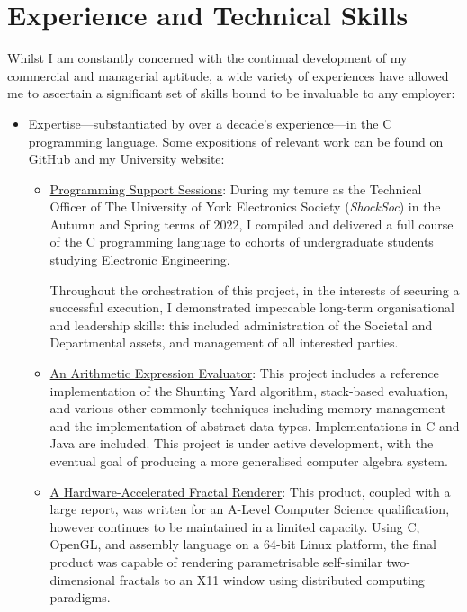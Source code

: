 \documentclass[final]{article}
\newcommand{\githublink}[2]{\href{https://github.com/oliverdixon/#1}{#2}}
\newcommand{\weblink}[2]{\href{https://www-users.york.ac.uk/~od641/#1}{#2}}
\begin{document}
\section{Experience and Technical Skills}
Whilst I am constantly concerned with the continual development of my commercial
and managerial aptitude, a wide variety of experiences have allowed me to
ascertain a significant set of skills bound to be invaluable to any employer:
\begin{itemize}
        \item Expertise---substantiated by over a decade's experience---in the C
        programming language. Some expositions of relevant work can be found on
        GitHub and my University website:
        \begin{itemize}
                \item \weblink{pss}{Programming Support Sessions}: During my
                tenure as the Technical Officer of The University of York
                Electronics Society (\textit{ShockSoc}) in the Autumn and Spring
                terms of 2022, I compiled and delivered a full course of the C
                programming language to cohorts of undergraduate students
                studying Electronic Engineering.

                Throughout the orchestration of this project, in the interests
                of securing a successful execution, I demonstrated impeccable
                long-term organisational and leadership skills: this included
                administration of the Societal and Departmental assets, and
                management of all interested parties.

                \item \githublink{calculator-demo}{An Arithmetic Expression
                Evaluator}: This project includes a reference implementation of
                the Shunting Yard algorithm, stack-based evaluation, and various
                other commonly techniques including memory management and the
                implementation of abstract data types.  Implementations in C and
                Java are included. This project is under active development,
                with the eventual goal of producing a more generalised computer
                algebra system.

                \item \weblink{fractal}{A Hardware-Accelerated Fractal
                Renderer}: This product, coupled with a large report, was
                written for an A-Level Computer Science qualification, however
                continues to be maintained in a limited capacity. Using C,
                OpenGL, and assembly language on a 64-bit Linux platform, the
                final product was capable of rendering parametrisable
                self-similar two-dimensional fractals to an X11 window using
                distributed computing paradigms.


\end{itemize}
\end{itemize}
\end{document}
